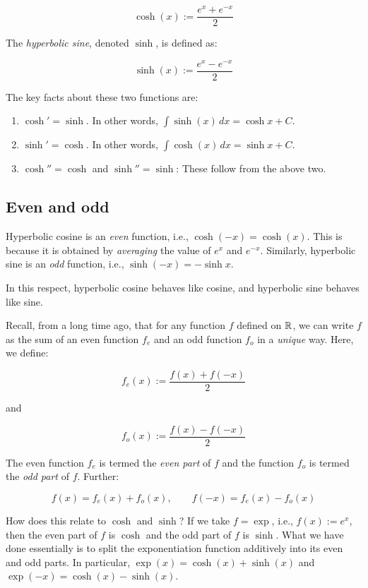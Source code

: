 \documentclass{amsart}
\begin{document}
$$\cosh (x) := \frac{e^x + e^{-x}}{2}$$

The {\em hyperbolic sine}, denoted $\sinh$, is defined as:

$$\sinh(x) := \frac{e^x - e^{-x}}{2}$$

The key facts about these two functions are:

\begin{enumerate}
\item $\cosh' = \sinh$. In other words, $\int \sinh(x) \, dx = \cosh x +
  C$.
\item $\sinh' = \cosh$. In other words, $\int \cosh(x) \, dx = \sinh x + C$.
\item $\cosh'' = \cosh$ and $\sinh'' = \sinh$: These follow from the
  above two.
\end{enumerate}

\subsection{Even and odd}

Hyperbolic cosine is an {\em even} function, i.e., $\cosh(-x) =
\cosh(x)$. This is because it is obtained by {\em averaging} the value
of $e^x$ and $e^{-x}$. Similarly, hyperbolic sine is an {\em odd}
function, i.e., $\sinh(-x) = -\sinh x$.

In this respect, hyperbolic cosine behaves like cosine, and hyperbolic
sine behaves like sine.

Recall, from a long time ago, that for any function $f$ defined on
$\mathbb{R}$, we can write $f$ as the sum of an even function $f_e$ and an odd
function $f_o$ in a {\em unique} way. Here, we define:

$$f_e(x) := \frac{f(x) + f(-x)}{2}$$

and

$$f_o(x) := \frac{f(x) - f(-x)}{2}$$

The even function $f_e$ is termed the {\em even part} of $f$ and the
function $f_o$ is termed the {\em odd part} of $f$. Further:

$$f(x) = f_e(x) + f_o(x), \qquad f(-x) = f_e(x) - f_o(x)$$

How does this relate to $\cosh$ and $\sinh$? If we take $f = \exp$,
i.e., $f(x) := e^x$, then the even part of $f$ is $\cosh$ and the odd
part of $f$ is $\sinh$. What we have done essentially is to split the
exponentiation function additively into its even and odd parts. In
particular, $\exp(x) = \cosh(x) + \sinh(x)$ and $\exp(-x) = \cosh(x) -
\sinh(x)$.
\end{document}
